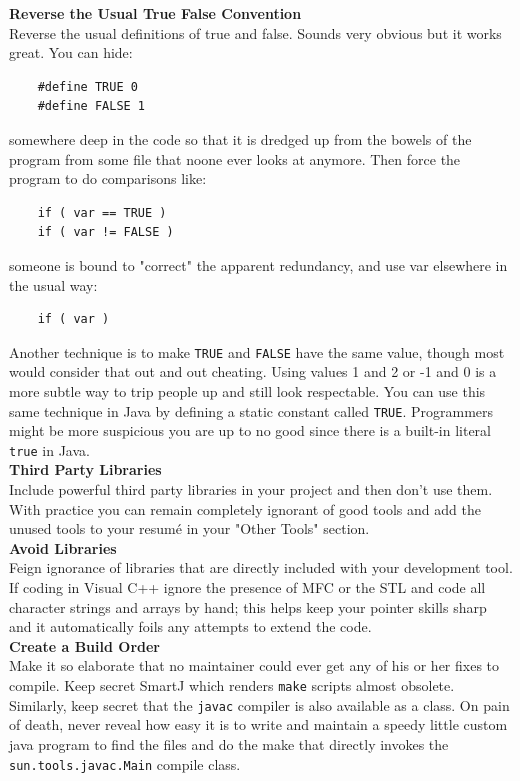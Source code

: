 \documentclass[11pt,twoside,a4paper]{article}
\begin{document}
\textbf{Reverse the Usual True False Convention}~\\
Reverse the usual definitions of true and false. Sounds very obvious but it works great. You can hide: 
\begin{verbatim}
	#define TRUE 0 
	#define FALSE 1
\end{verbatim}  
somewhere deep in the code so that it is dredged up from the bowels of the program from some file that noone ever looks at anymore. Then force the program to do comparisons like: 
\begin{verbatim}
	if ( var == TRUE ) 
	if ( var != FALSE ) 
\end{verbatim} 
someone is bound to "correct" the apparent redundancy, and use var elsewhere in the usual way: 
\begin{verbatim}
	if ( var ) 
\end{verbatim} 
Another technique is to make \texttt{TRUE} and \texttt{FALSE} have the same value, though most would consider that out and out cheating. Using values 1 and 2 or -1 and 0 is a more subtle way to trip people up and still look respectable. You can use this same technique in Java by defining a static constant called \texttt{TRUE}. Programmers might be more suspicious you are up to no good since there is a built-in literal \texttt{true} in Java. ~\\

\textbf{Third Party Libraries}~\\
Include powerful third party libraries in your project and then don't use them. With practice you can remain completely ignorant of good tools and add the unused tools to your resumé in your "Other Tools" section. ~\\

\textbf{Avoid Libraries}~\\
Feign ignorance of libraries that are directly included with your development tool. If coding in Visual C++ ignore the presence of MFC or the STL and code all character strings and arrays by hand; this helps keep your pointer skills sharp and it automatically foils any attempts to extend the code. ~\\

\textbf{Create a Build Order}~\\
Make it so elaborate that no maintainer could ever get any of his or her fixes to compile. Keep secret SmartJ which renders \texttt{make} scripts almost obsolete. Similarly, keep secret that the \texttt{javac} compiler is also available as a class. On pain of death, never reveal how easy it is to write and maintain a speedy little custom java program to find the files and do the make that directly invokes the \texttt{sun.tools.javac.Main} compile class. ~\\
\end{document}
